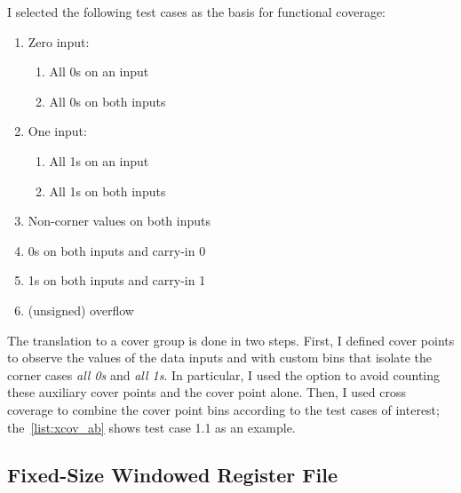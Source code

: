 \noindent I selected the following test cases as the basis for functional coverage:
\begin{enumerate}
    \item Zero input:
    \begin{enumerate}[label*=\arabic*.]
        \item All 0s on an input
        \item All 0s on both inputs
    \end{enumerate}
    \item One input:
    \begin{enumerate}[label*=\arabic*.]
        \item All 1s on an input
        \item All 1s on both inputs
    \end{enumerate}
    \item Non-corner values on both inputs
    \item 0s on both inputs and carry-in 0
    \item 1s on both inputs and carry-in 1
    \item (unsigned) overflow
\end{enumerate}

The translation to a \sv cover group is done in two steps. First, I defined cover points to observe the values of the data inputs  and  with custom bins that isolate the corner cases \emph{all 0s} and \emph{all 1s}. In particular, I used the option  to avoid counting these auxiliary cover points and the  cover point alone. Then, I used cross coverage to combine the cover point bins according to the test cases of interest; the~\cref{list:xcov_ab} shows test case 1.1 as an example.

\subsection{Fixed-Size Windowed Register File}\label{subsec:vplan-wrf}


